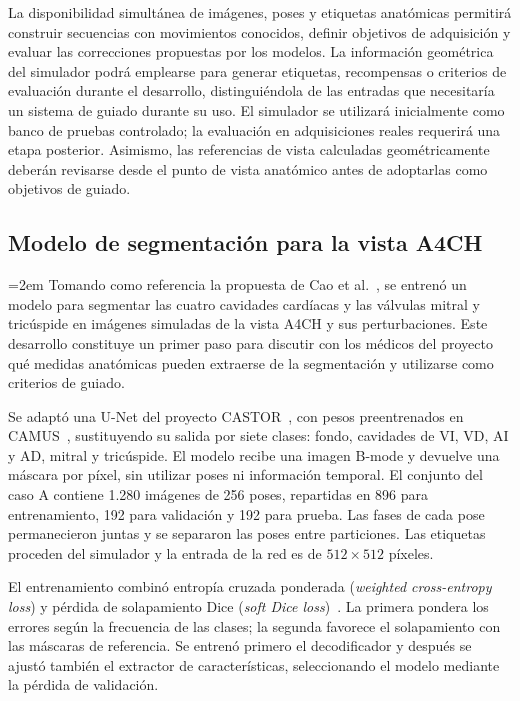 \documentclass[10pt,a4paper]{article}
\begin{document}
La disponibilidad simultánea de imágenes, poses y etiquetas anatómicas permitirá construir secuencias con movimientos conocidos, definir objetivos de adquisición y evaluar las correcciones propuestas por los modelos. La información geométrica del simulador podrá emplearse para generar etiquetas, recompensas o criterios de evaluación durante el desarrollo, distinguiéndola de las entradas que necesitaría un sistema de guiado durante su uso. El simulador se utilizará inicialmente como banco de pruebas controlado; la evaluación en adquisiciones reales requerirá una etapa posterior. Asimismo, las referencias de vista calculadas geométricamente deberán revisarse desde el punto de vista anatómico antes de adoptarlas como objetivos de guiado.

\subsection{Modelo de segmentación para la vista A4CH}\label{sec:segmentacion_a4ch}
\begingroup
\emergencystretch=2em
Tomando como referencia la propuesta de Cao et al.~\cite{Cao2026}, se entrenó un modelo para segmentar las cuatro cavidades cardíacas y las válvulas mitral y tricúspide en imágenes simuladas de la vista A4CH y sus perturbaciones. Este desarrollo constituye un primer paso para discutir con los médicos del proyecto qué medidas anatómicas pueden extraerse de la segmentación y utilizarse como criterios de guiado.

Se adaptó una U-Net del proyecto CASTOR~\cite{CastorSoftware}, con pesos preentrenados en CAMUS~\cite{Leclerc2019CAMUS}, sustituyendo su salida por siete clases: fondo, cavidades de VI, VD, AI y AD, mitral y tricúspide. El modelo recibe una imagen B-mode y devuelve una máscara por píxel, sin utilizar poses ni información temporal. El conjunto del caso A contiene 1.280 imágenes de 256 poses, repartidas en 896 para entrenamiento, 192 para validación y 192 para prueba. Las fases de cada pose permanecieron juntas y se separaron las poses entre particiones. Las etiquetas proceden del simulador y la entrada de la red es de $512\times512$ píxeles.

El entrenamiento combinó entropía cruzada ponderada (\textit{weighted cross-entropy loss}) y pérdida de solapamiento Dice (\textit{soft Dice loss})~\cite{BishopBishop2024,Milletari2016Dice}. La primera pondera los errores según la frecuencia de las clases; la segunda favorece el solapamiento con las máscaras de referencia. Se entrenó primero el decodificador y después se ajustó también el extractor de características, seleccionando el modelo mediante la pérdida de validación.
\end{document}
